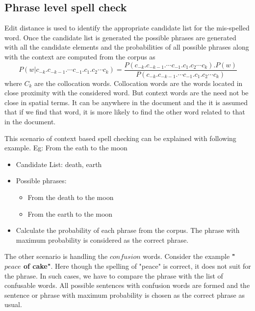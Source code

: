 \documentclass{bmcart}
\begin{document}
\subsection{Phrase level spell check}
\label{ssec:phraseSpellCheck}
	Edit distance is used to identify the appropriate candidate list for the mis-spelled word. Once the candidate list is generated the possible phrases are generated with all the candidate elements and the probabilities of all possible phrases along with the context are computed from the corpus as 
	\begin{equation}
	P(w|c_{-k}.c_{-k-1}.\cdots c_{-1}.c_{1}.c_{2} \cdots c_{k}) = \frac{P(c_{-k}.c_{-k-1}.\cdots c_{-1}.c_{1}.c_{2} \cdots c_{k}).P(w)}{P(c_{-k}.c_{-k-1}.\cdots c_{-1}.c_{1}.c_{2} \cdots c_{k})}
	\end{equation}
	where $C_k$ are the collocation words. Collocation words are the words located in close proximity with the considered word. But context words are the need not be close in spatial terms. It can be anywhere in the document and the it is assumed that if we find that word, it is more likely to find the other word related to that in the document.
	
	 This scenario of context based spell checking can be explained with following example.
	Eg: From the eath to the moon
	
	\begin{itemize}
	\item Candidate List: { death, earth}
	\item Possible phrases: 
		\begin{itemize}
		\item From the death to the moon
		\item From the earth to the moon
		\end{itemize}
	\item Calculate the probability of each phrase from the corpus. The phrase with maximum probability is considered as the correct phrase.
	\end{itemize}

	The other scenario is handling the $confusion$ words. Consider the example {\bf "$peace$ of cake"}.  Here though the spelling of "peace" is correct, it does not suit for the phrase. In such cases, we have to compare the phrase with the list of confusable words. All possible sentences with confusion words are formed and the sentence or phrase with maximum probability is chosen as the correct phrase as usual.
	
\end{document}
